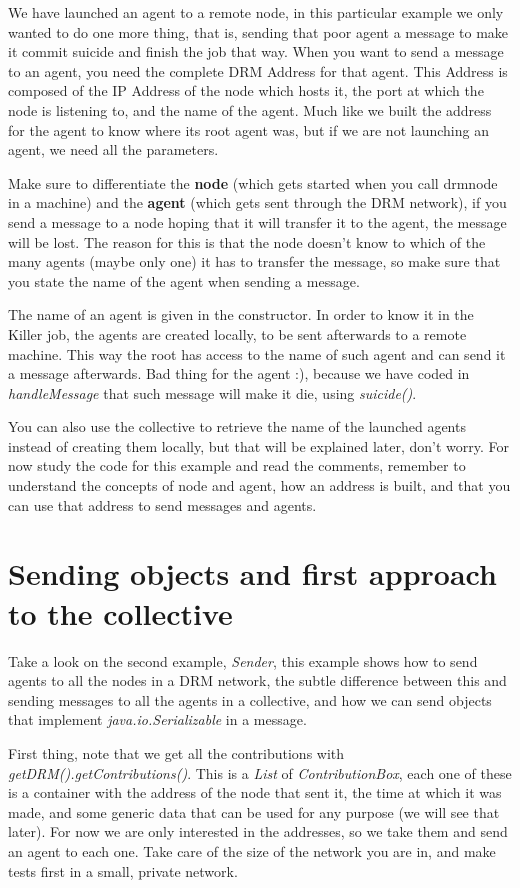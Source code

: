 \documentclass{article}
\begin{document}
We have launched an agent to a remote node, in this particular example we only wanted to do one more thing, that is, sending that poor agent a message to make it commit suicide and finish the job that way. When you want to send a message to an agent, you need the complete DRM Address for that agent. This Address is composed of the IP Address of the node which hosts it, the port at which the node is listening to, and the name of the agent. Much like we built the address for the agent to know where its root agent was, but if we are not launching an agent, we need all the parameters.

Make sure to differentiate the {\bf node} (which gets started when you call drmnode in a machine) and the {\bf agent} (which gets sent through the DRM network), if you send a message to a node hoping that it will transfer it to the agent, the message will be lost. The reason for this is that the node doesn't know to which of the many agents (maybe only one) it has to transfer the message, so make sure that you state the name of the agent when sending a message.

The name of an agent is given in the constructor. In order to know it in the Killer job, the agents are created locally, to be sent afterwards to a remote machine. This way the root has access to the name of such agent and can send it a message afterwards. Bad thing for the agent :), because we have coded in \textsl{handleMessage} that such message will make it die, using \textsl{suicide()}.

You can also use the collective to retrieve the name of the launched agents instead of creating them locally, but that will be explained later, don't worry. For now study the code for this example and read the comments, remember to understand the concepts of node and agent, how an address is built, and that you can use that address to send messages and agents.

\section{Sending objects and first approach to the collective}

Take a look on the second example, \textsl{Sender}, this example shows how to send agents to all the nodes in a DRM network, the subtle difference between this and sending messages to all the agents in a collective, and how we can send objects that implement \textsl{java.io.Serializable} in a message.

First thing, note that we get all the contributions with \textsl{getDRM().getContributions()}. This is a \textsl{List} of \textsl{ContributionBox}, each one of these is a container with the address of the node that sent it, the time at which it was made, and some generic data that can be used for any purpose (we will see that later). For now we are only interested in the addresses, so we take them and send an agent to each one. Take care of the size of the network you are in, and make tests first in a small, private network.
\end{document}
